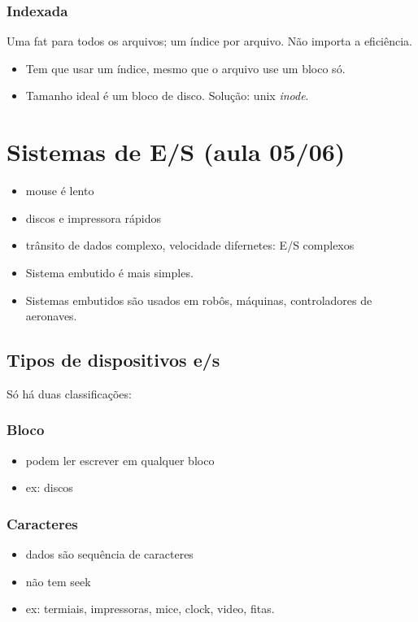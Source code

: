 \documentclass[11pt]{article}
\begin{document}
\subsubsection{Indexada}
\label{sec:orgcceec03}
Uma fat para todos os arquivos; um índice por arquivo. Não importa a eficiência.
\begin{itemize}
\item Tem que usar um índice, mesmo que o arquivo use um bloco só.
\item Tamanho ideal é um bloco de disco.
Solução: unix \emph{inode}.
\end{itemize}
\section{Sistemas de E/S (aula 05/06)}
\label{sec:orgd608111}
\begin{itemize}
\item mouse é lento
\item discos e impressora rápidos
\item trânsito de dados complexo, velocidade difernetes: E/S complexos
\item Sistema embutido é mais simples.
\item Sistemas embutidos são usados em robôs, máquinas, controladores de aeronaves.
\end{itemize}
\subsection{Tipos de dispositivos e/s}
\label{sec:orgabd139c}
Só há duas classificações:
\subsubsection{Bloco}
\label{sec:org7c1daa6}
\begin{itemize}
\item podem ler escrever em qualquer bloco
\item ex: discos
\end{itemize}
\subsubsection{Caracteres}
\label{sec:org32c8e9a}
\begin{itemize}
\item dados são sequência de caracteres
\item não tem seek
\item ex: termiais, impressoras, mice, clock, video, fitas.
\end{itemize}
\end{document}
